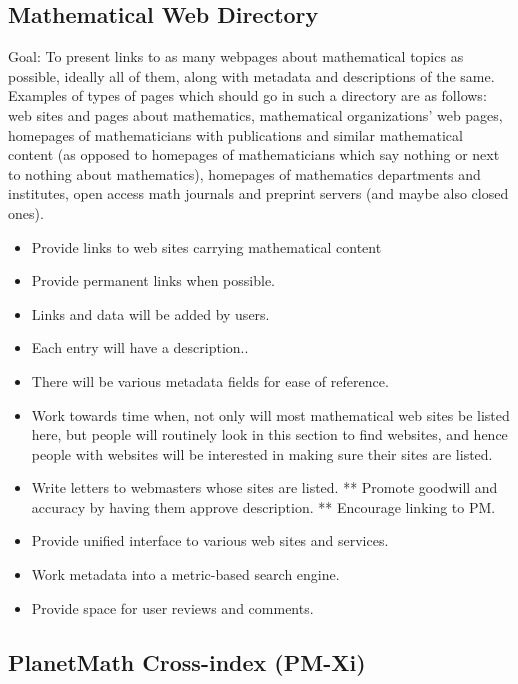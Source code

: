 \subsection{Mathematical Web Directory}

Goal: To present links to as many webpages about mathematical topics as
possible, ideally all of them, along with metadata and descriptions of
the same. Examples of types of pages which should go in such a directory
are as follows: web sites and pages about mathematics, mathematical
organizations' web pages, homepages of mathematicians with publications
and similar mathematical content (as opposed to homepages of
mathematicians which say nothing or next to nothing about mathematics),
homepages of mathematics departments and institutes, open access math
journals and preprint servers (and maybe also closed ones).

\begin{itemize}
\item
  Provide links to web sites carrying mathematical content
\item
  Provide permanent links when possible.
\item
  Links and data will be added by users.
\item
  Each entry will have a description..
\item
  There will be various metadata fields for ease of reference.
\item
  Work towards time when, not only will most mathematical web sites be
  listed here, but people will routinely look in this section to find
  websites, and hence people with websites will be interested in making
  sure their sites are listed.
\item
  Write letters to webmasters whose sites are listed. ** Promote
  goodwill and accuracy by having them approve description. ** Encourage
  linking to PM.
\item
  Provide unified interface to various web sites and services.
\item
  Work metadata into a metric-based search engine.
\item
  Provide space for user reviews and comments.
\end{itemize}
\subsection{PlanetMath Cross-index (PM-Xi)}


